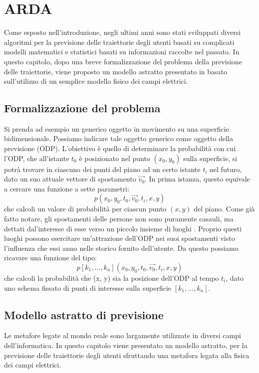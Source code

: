 \section{ARDA}
Come esposto nell'introduzione, negli ultimi anni sono stati sviluppati diversi
algoritmi per la previsione delle traiettorie degli utenti basati su complicati
modelli matematici e statistici basati su informazioni raccolte nel passato. In
questo capitolo, dopo una breve formalizzazione del problema della previsione
delle traiettorie, viene proposto un modello astratto presentato in \cite{cit_50}
basato sull'utilizzo di un semplice modello fisico dei campi elettrici.

\subsection{Formalizzazione del problema}
Si prenda ad esempio un generico oggetto in movimento su una superficie
bidimensionale. Possiamo indicare tale oggetto generico come oggetto della previsione
(ODP). L'obiettivo \`e quello di determinare la probabilit\`a con cui l'ODP,
che all'istante $t_{0}$ \`e posizionato nel punto $(x_{0}, y_{0})$ sulla superficie,
si potr\`a trovare in ciascuno dei punti del piano ad un certo istante $t_{i}$ nel futuro,
dato un suo attuale vettore di spostamento $\vec{v_{0}}$.
In prima istanza, questo equivale a cercare una funzione a sette parametri:
\begin{equation}
p(x_{0},y_{0},t_{0},\vec{v_{0}},t_{i},x,y)
\end{equation}
che calcoli un valore di probabilit\`a per ciascun punto $(x, y)$ del piano.
Come gi\`a fatto notare, gli spostamenti delle persone non sono puramente casauli,
ma dettati dal'interesse di esse verso un piccolo insieme di luoghi \cite{cit_44}.
Proprio questi luoghi possono esercitare un'attrazione dell'ODP nei suoi spostamenti
visto l'influenza che essi anno nelle storico fornito dell'utente.
Da questo possiamo ricavare una funzione del tipo:
\begin{equation}
p[k_{1},\dots,k_{n}](x_{0},y_{0},t_{0},\vec{v_{0}},t_{i},x,y)
\end{equation}
che calcoli la probabilit\`a che (x, y) sia la posizione dell'ODP al tempo $t_{i}$,
dato uno schema fissato di punti di interesse sulla superficie $[k_{1},\dots,k_{n}]$.

\subsection{Modello astratto di previsione}
Le metafore legate al mondo reale sono largamente utilizzate in diversi campi
dell'informatica. In questo capitolo viene presentato un modello astratto,
per la previsione delle traiettorie degli utenti sfruttando una
metafora legata alla fisica dei campi elettrici.

